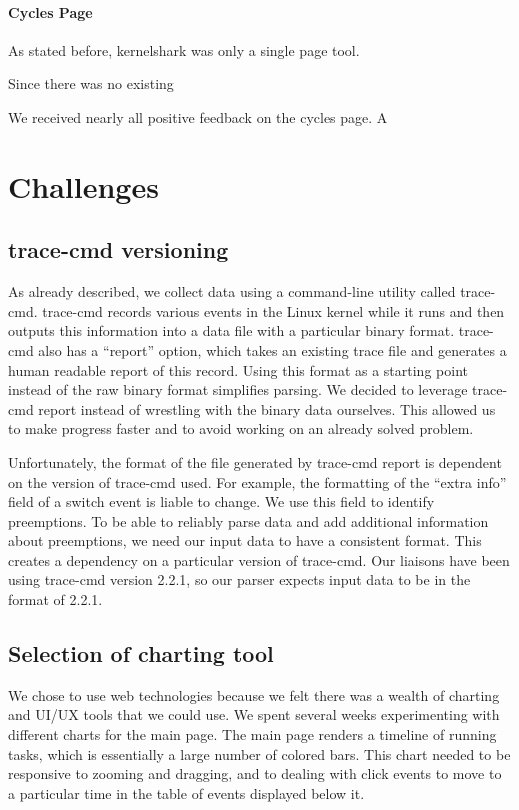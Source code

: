 \documentclass{hmcclinic}
\begin{document}
\subsubsection{Cycles Page}

As stated before, kernelshark was only a single page tool. 

Since there was no existing 

We received nearly all positive feedback on the cycles page. A


\chapter{Challenges}
\section{trace-cmd versioning} %
  As already described, we collect data using a command-line utility called
  trace-cmd. trace-cmd records various events in the Linux kernel while it runs
  and then outputs this information into a data file with a particular binary
  format. trace-cmd also has a ``report'' option, which takes an existing trace
  file and generates a human readable report of this record. Using this format
  as a starting point instead of the raw binary format simplifies parsing.
  We decided to leverage trace-cmd report instead of wrestling with the binary
  data ourselves. This allowed us to make progress faster and to avoid working
  on an already solved problem.

  Unfortunately, the format of the file generated by trace-cmd report is
  dependent on the version of trace-cmd used. For example, the formatting of the
  ``extra info'' field of a switch event is liable to change. We use this
  field to identify preemptions. To be able to reliably parse data and add
  additional information about preemptions, we need our input data to have
  a consistent format. This creates a dependency on a particular version
  of trace-cmd. Our liaisons have been using trace-cmd version 2.2.1, so
  our parser expects input data to be in the format of 2.2.1.
\section{Selection of charting tool} %
  We chose to use web technologies because we felt there was a wealth of
  charting and UI/UX tools that we could use. We spent several weeks
  experimenting with different charts for the main page. The main page renders a
  timeline of running tasks, which is essentially a large number of colored
  bars. This chart needed to be responsive to zooming and dragging, and to
  dealing with click events to move to a particular time in the table of events
  displayed below it.
\end{document}
